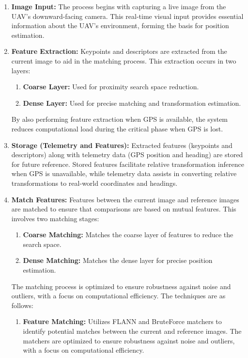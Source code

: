 \begin{enumerate}
    \item \textbf{Image Input:}  
    The process begins with capturing a live image from the UAV’s downward-facing camera. This real-time visual input provides essential information about the UAV’s environment, forming the basis for position estimation.

    \item \textbf{Feature Extraction:}  
    Keypoints and descriptors are extracted from the current image to aid in the matching process. This extraction occurs in two layers:
    \begin{enumerate}
        \item \textbf{Coarse Layer:} Used for proximity search space reduction.
        \item \textbf{Dense Layer:} Used for precise matching and transformation estimation. 
    \end{enumerate}
    By also performing feature extraction when GPS is available, the system reduces computational load during the critical phase when GPS is lost. 

    \item \textbf{Storage (Telemetry and Features):}  
    Extracted features (keypoints and descriptors) along with telemetry data (GPS position and heading) are stored for future reference. Stored features facilitate relative transformation inference when GPS is unavailable, while telemetry data assists in converting relative transformations to real-world coordinates and headings.

    \item \textbf{Match Features:}  
    Features between the current image and reference images are matched to ensure that comparisons are based on mutual features. This involves two matching stages:
    \begin{enumerate}
        \item \textbf{Coarse Matching:} Matches the coarse layer of features to reduce the search space.
        \item \textbf{Dense Matching:} Matches the dense layer for precise position estimation.
    \end{enumerate}
    The matching process is optimized to ensure robustness against noise and outliers, with a focus on computational efficiency. The techniques are as follows:
    \begin{enumerate}
        \item \textbf{Feature Matching:}  
        Utilizes FLANN and BruteForce matchers to identify potential matches between the current and reference images. The matchers are optimized to ensure robustness against noise and outliers, with a focus on computational efficiency.
        

\end{enumerate}
\end{enumerate}
